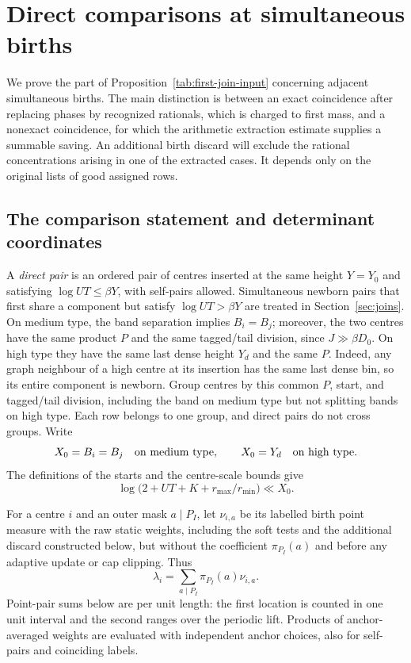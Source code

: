 \section{Direct comparisons at simultaneous births}\label{sec:direct}

We prove the part of Proposition~\ref{tab:first-join-input} concerning
adjacent simultaneous births. The main distinction is between an exact coincidence
after replacing phases by recognized rationals, which is charged to first
mass, and a nonexact coincidence, for which the arithmetic extraction
estimate supplies a summable saving. An additional birth discard will
exclude the rational concentrations arising in one of the extracted cases.
It depends only on the original lists of good assigned rows.

\subsection{The comparison statement and determinant coordinates}

A \emph{direct pair} is an ordered pair of centres inserted at the same
height $Y=Y_0$ and satisfying $\log UT\le\beta Y$, with self-pairs allowed.
Simultaneous newborn pairs that first share a component but satisfy
$\log UT>\beta Y$ are treated in Section~\ref{sec:joins}.
On medium type, the band separation implies $B_i=B_j$; moreover, the two
centres have the same product $P$ and the same tagged/tail division, since
$J\gg\beta D_0$. On high type they have the same last dense height $Y_d$
and the same $P$. Indeed, any graph neighbour of a high centre at its
insertion has the same last dense bin, so its entire component is newborn.
Group centres by this common $P$, start, and tagged/tail division, including
the band on medium type but not splitting bands on high type. Each row
belongs to one group, and direct pairs do not cross groups. Write
\[
 X_0=B_i=B_j\quad\hbox{on medium type},
 \qquad X_0=Y_d\quad\hbox{on high type}.
\]
The definitions of the starts and the centre-scale bounds give
\begin{equation}\label{eq:direct-size}
 \log\bigl(2+UT+K+r_{\max}/r_{\min}\bigr)\ll X_0.
\end{equation}

For a centre $i$ and an outer mask $a\mid P_I$, let $\nu_{i,a}$ be its
labelled birth point measure with the raw static weights, including the
soft tests and the additional discard constructed below, but without the
coefficient $\pi_{P_I}(a)$ and before any adaptive update or cap clipping.
Thus
\[
 \lambda_i=\sum_{a\mid P_I}\pi_{P_I}(a)\nu_{i,a}.
\]
Point-pair sums below are per unit length: the first location is counted in
one unit interval and the second ranges over the periodic lift. Products
of anchor-averaged weights are evaluated with independent anchor choices,
also for self-pairs and coinciding labels.

